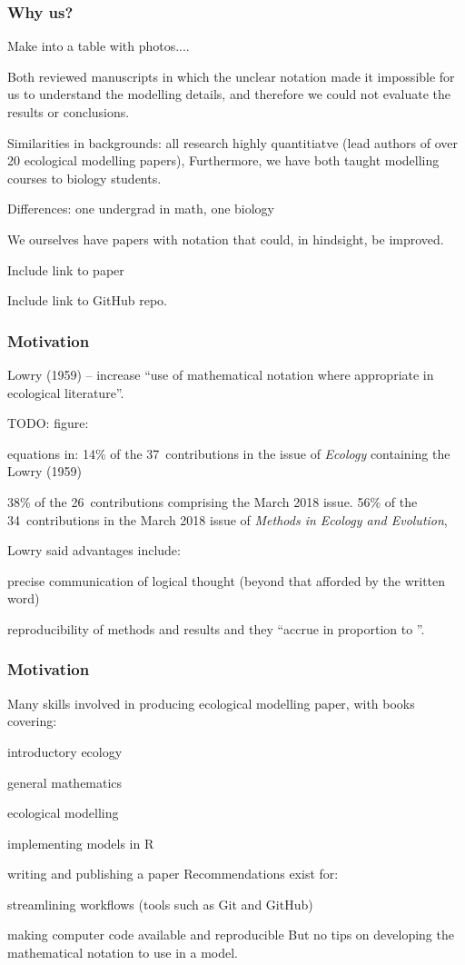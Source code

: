 \begin{frame}
\frametitle{Why us?}
Make into a table with photos....

Both reviewed manuscripts in which the unclear
notation made it impossible for us to understand the modelling details, and
therefore we could not evaluate the results or conclusions.

Similarities in backgrounds: all research highly quantitiatve
(lead authors of over 20 ecological modelling papers),
Furthermore, we have both taught modelling courses to biology students.

Differences: one undergrad in math, one biology

We ourselves have papers with notation that could, in hindsight, be improved.

Include link to paper

Include link to GitHub repo.
\end{frame}



\begin{frame}
\frametitle{Motivation}
Lowry (1959) -- increase ``use of mathematical notation
where appropriate in ecological literature''.

TODO: figure:

equations in:
 14\% of the 37~contributions in the issue of \emph{Ecology} containing the
 Lowry (1959)

38\% of the 26~contributions comprising the March 2018 issue.
56\% of the 34~contributions in the March 2018 issue of \emph{Methods in Ecology and Evolution},

Lowry said advantages include:
\bi
\item precise communication of logical thought (beyond that afforded by
  the written word)
\item reproducibility of methods and results
\ei
and they ``accrue in proportion to
''.
\end{frame}


\begin{frame}
\frametitle{Motivation}
Many skills involved in producing ecological modelling paper, with books covering:
\bi
\item introductory ecology
\item general mathematics
\item ecological modelling
\item implementing models in R
\item writing and publishing a paper
\ei
  Recommendations exist for:
\bi
\item streamlining workflows (tools such as Git and GitHub)
\item making computer code available and reproducible
\ei
But no tips on developing the mathematical notation to use in a model.

\end{frame}

